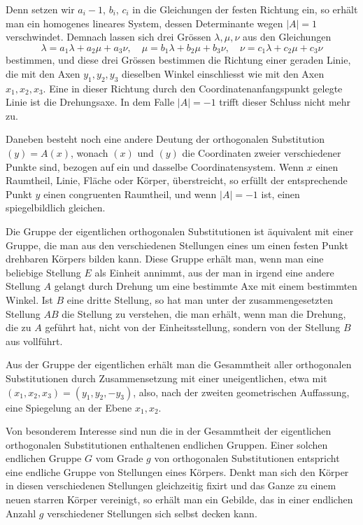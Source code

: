 \documentclass[11pt]{article}
\begin{document}
Denn setzen wir $a_i-1$, $b_i$, $c_i$ in die Gleichungen der festen Richtung ein, so erhält man ein homogenes lineares System, dessen Determinante wegen $|A|=1$ verschwindet. Demnach lassen sich drei Grössen $\lambda,\mu,\nu$ aus den Gleichungen
\[
\lambda=a_1\lambda+a_2\mu+a_3\nu,
\quad
\mu=b_1\lambda+b_2\mu+b_3\nu,
\quad
\nu=c_1\lambda+c_2\mu+c_3\nu
\]
bestimmen, und diese drei Grössen bestimmen die Richtung einer geraden Linie, die mit den Axen $y_1,y_2,y_3$ dieselben Winkel einschliesst wie mit den Axen $x_1,x_2,x_3$. Eine in dieser Richtung durch den Coordinatenanfangspunkt gelegte Linie ist die Drehungsaxe. In dem Falle $|A|=-1$ trifft dieser Schluss nicht mehr zu.

Daneben besteht noch eine andere Deutung der orthogonalen Substitution $(y)=A(x)$, wonach $(x)$ und $(y)$ die Coordinaten zweier verschiedener Punkte sind, bezogen auf ein und dasselbe Coordinatensystem. Wenn $x$ einen Raumtheil, Linie, Fläche oder Körper, überstreicht, so erfüllt der entsprechende Punkt $y$ einen congruenten Raumtheil, und wenn $|A|=-1$ ist, einen spiegelbildlich gleichen.

Die Gruppe der eigentlichen orthogonalen Substitutionen ist äquivalent mit einer Gruppe, die man aus den verschiedenen Stellungen eines um einen festen Punkt drehbaren Körpers bilden kann. Diese Gruppe erhält man, wenn man eine beliebige Stellung $E$ als Einheit annimmt, aus der man in irgend eine andere Stellung $A$ gelangt durch Drehung um eine bestimmte Axe mit einem bestimmten Winkel. Ist $B$ eine dritte Stellung, so hat man unter der zusammengesetzten Stellung $AB$ die Stellung zu verstehen, die man erhält, wenn man die Drehung, die zu $A$ geführt hat, nicht von der Einheitsstellung, sondern von der Stellung $B$ aus vollführt.

Aus der Gruppe der eigentlichen erhält man die Gesammtheit aller orthogonalen Substitutionen durch Zusammensetzung mit einer uneigentlichen, etwa mit $(x_1,x_2,x_3)=(y_1,y_2,-y_3)$, also, nach der zweiten geometrischen Auffassung, eine Spiegelung an der Ebene $x_1,x_2$.

Von besonderem Interesse sind nun die in der Gesammtheit der eigentlichen orthogonalen Substitutionen enthaltenen endlichen Gruppen. Einer solchen endlichen Gruppe $G$ vom Grade $g$ von orthogonalen Substitutionen entspricht eine endliche Gruppe von Stellungen eines Körpers. Denkt man sich den Körper in diesen verschiedenen Stellungen gleichzeitig fixirt und das Ganze zu einem neuen starren Körper vereinigt, so erhält man ein Gebilde, das in einer endlichen Anzahl $g$ verschiedener Stellungen sich selbst decken kann.
\end{document}
